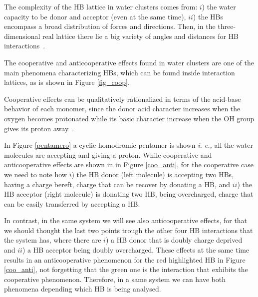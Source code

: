 The complexity of the HB lattice in water clusters comes from: $i$) the water
capacity to be donor and acceptor (even at the same time), $ii$)
the HBs encompass a broad distribution of forces and directions.
Then, in the three-dimensional real lattice there lie a
big variety of angles and distances for HB interactions~\cite{liu_science,
smith2005}. 

The cooperative and anticooperative effects found in water clusters
are one of the main phenomena characterizing HBs,
which can be found inside interaction lattices, as is
shown in Figure \ref{fig_coop}. 

Cooperative effects can be qualitatively rationalized in terms of
the acid-base behavior of each monomer, since the donor acid character
increases when the oxygen becomes protonated while its basic character increase
when the OH group gives its proton away~\cite{M1992}.

In Figure \ref{pentamero} a cyclic homodromic pentamer is shown \textit{i. e.,}
all the water molecules are accepting and giving a proton. 
While cooperative and anticooperative effects are shown in in Figure \ref{coo_anti},
for the cooperative case we need to note how $i$) the HB donor (left molecule) is
accepting two HBs, having a charge bereft, charge that can be recover by donating a HB, 
and $ii$) the HB acceptor (right molecule) is donating two HB,
being overcharged, charge that can be easily transferred by accepting a HB.


In contrast, in the same system we will see also anticooperative effects, for
that we should thought the last two points trough the other four HB
interactions that the system has, where there are $i$) a HB donor that is
doubly charge deprived and $ii$) a HB acceptor being doubly overcharged.  These
effects at the same time results in an anticooperative phenomenon for the red
highlighted HB in Figure \ref{coo_anti}, not forgetting that the green one is
the interaction that exhibits the cooperative phenomenon. Therefore, in a same
system we can have both phenomena depending which HB is being analysed.

